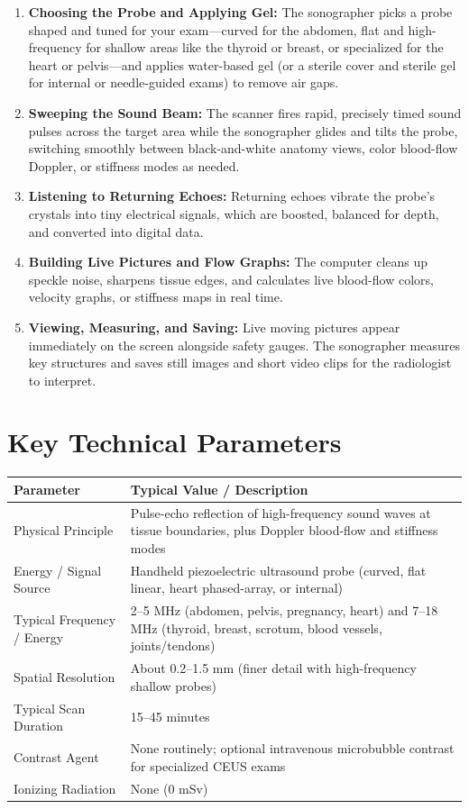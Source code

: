 \begin{enumerate}
    \item \textbf{Choosing the Probe and Applying Gel:} The sonographer picks a probe shaped and tuned for your exam---curved for the abdomen, flat and high-frequency for shallow areas like the thyroid or breast, or specialized for the heart or pelvis---and applies water-based gel (or a sterile cover and sterile gel for internal or needle-guided exams) to remove air gaps.
    \item \textbf{Sweeping the Sound Beam:} The scanner fires rapid, precisely timed sound pulses across the target area while the sonographer glides and tilts the probe, switching smoothly between black-and-white anatomy views, color blood-flow Doppler, or stiffness modes as needed.
    \item \textbf{Listening to Returning Echoes:} Returning echoes vibrate the probe's crystals into tiny electrical signals, which are boosted, balanced for depth, and converted into digital data.
    \item \textbf{Building Live Pictures and Flow Graphs:} The computer cleans up speckle noise, sharpens tissue edges, and calculates live blood-flow colors, velocity graphs, or stiffness maps in real time.
    \item \textbf{Viewing, Measuring, and Saving:} Live moving pictures appear immediately on the screen alongside safety gauges. The sonographer measures key structures and saves still images and short video clips for the radiologist to interpret.
\end{enumerate}

\section{Key Technical Parameters}

\noindent
\begin{tabularx}{\textwidth}{@{}l X@{}}
\toprule
\textbf{Parameter} & \textbf{Typical Value / Description} \\
\midrule
Physical Principle & Pulse-echo reflection of high-frequency sound waves at tissue boundaries, plus Doppler blood-flow and stiffness modes \\
Energy / Signal Source & Handheld piezoelectric ultrasound probe (curved, flat linear, heart phased-array, or internal) \\
Typical Frequency / Energy & 2--5 MHz (abdomen, pelvis, pregnancy, heart) and 7--18 MHz (thyroid, breast, scrotum, blood vessels, joints/tendons) \\
Spatial Resolution & About 0.2--1.5 mm (finer detail with high-frequency shallow probes) \\
Typical Scan Duration & 15--45 minutes \\
Contrast Agent & None routinely; optional intravenous microbubble contrast for specialized CEUS exams \\
Ionizing Radiation & None (0 mSv) \\
\bottomrule
\end{tabularx}

